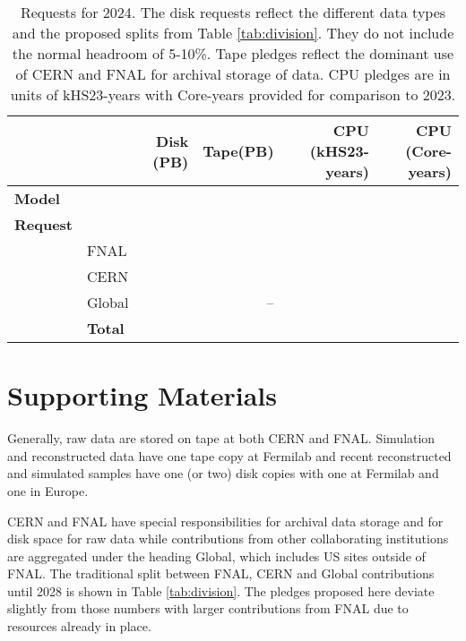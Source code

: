\documentclass[12pt]{article}
\begin{document}
\begin{table}[h]
\begin{centering}

\begin{tabular}{|llr|r|r|r|}
\hline
 	&&	Disk (PB)	&		Tape(PB)	&	CPU (kHS23-years)	 & CPU (Core-years)\\
	\hline
{\bf Model}	&&	\DISKTotal	&		\TAPETotal	&	\CPUTotal	& \CORESTotal\\
\hline
{\bf Request}	&&		 		&		&		\\
&FNAL	&	\DISKFNAL&	 	\TAPEFNAL	&	\CPUFNAL & \CORESFNAL	\\
&CERN	&	\DISKCERN	&	 	\TAPECERN&	\CPUCERN & \CORESCERN	\\
&Global	&	\DISKGlobal	&	 	--	&	\CPUGlobal   &\CORESGlobal\\
\hline
&{\bf Total}	&	\DISKTotal	&	 	\TAPETotal	&	\CPUTotal	 & \CORESTotal\\
\hline
\end{tabular}

\caption{Requests for 2024.  The disk requests reflect the different data types and the proposed splits from Table \ref{tab:division}.  They do not include the normal headroom of 5-10\%.  Tape pledges reflect the dominant use of CERN and FNAL for archival storage of data.  CPU pledges are in units of kHS23-years with Core-years provided for comparison to 2023.    }\label{tab:summary2024}
\end{centering}

\end{table}



\clearpage

\section{Supporting Materials}

Generally, raw data are stored on tape at both CERN and FNAL.  Simulation and reconstructed data  have one tape copy at Fermilab and recent reconstructed and simulated samples have one (or two) disk copies with one at Fermilab and one in Europe.  %

CERN and FNAL have special responsibilities for archival data storage and for disk space for raw data while contributions from  other collaborating institutions are aggregated under the heading Global, which includes US sites outside of FNAL.  The traditional split between FNAL, CERN and Global contributions until 2028 is shown in Table \ref{tab:division}.  The pledges proposed here deviate slightly from those numbers with larger contributions from FNAL due to resources already in place. 
\end{document}
